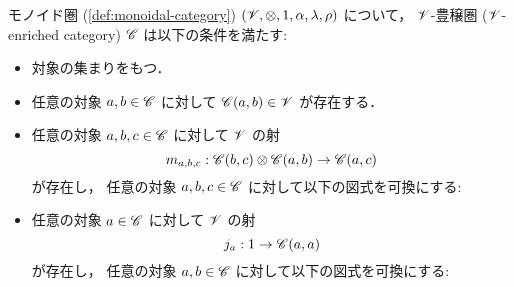 \documentclass[titlepage]{ltjsreport}
\newcommand{\objs}[1]{#1}
\newcommand{\mrp}[3]{{#1}:{#2}\to{#3}}
\newcommand{\mrps}[3]{#1(#2,#3)}
\newcommand{\id}[1]{\mathrm{id}_{#1}}
\begin{document}
{\begin{definition}[豊穣圏]
  モノイド圏 (\cref{def:monoidal-category})
  $(\mathscr{V},\otimes,1,\alpha,\lambda,\rho)$ について，
  $\mathscr{V}$-豊穣圏 ($\mathscr{V}$-enriched category) $\mathscr{C}$ は以下の条件を満たす:
  \begin{itemize}
    \item 対象の集まりをもつ．
    \item 任意の対象 $\a,\b\in\objs{\C}$ に対して
          $\mrps{\C}{\a}{\b}\in\mcat$ が存在する．
    \item 任意の対象 $\a,\b,\c\in\objs{\C}$ に対して $\mathscr{V}$ の射
          \begin{equation}
            \mrp{{m}_{\a,\b,\c}}{
              \mrps{\C}{\b}{\c}\tprod\mrps{\C}{\a}{\b}
            }{\mrps{\C}{\a}{\c}}
          \end{equation}
          が存在し，
          任意の対象 $\a,\b,\c\in\objs{\C}$ に対して以下の図式を可換にする:
          \begin{center}
          \end{center}
    \item 任意の対象 $\a\in\objs{\C}$ に対して $\mathscr{V}$ の射
          \begin{equation}
            \mrp{{j}_{\a}}{\tunit}{\mrps{\C}{\a}{\a}}
          \end{equation}
          が存在し，
          任意の対象 $\a,\b\in\objs{\C}$ に対して以下の図式を可換にする:
          \begin{center}
          \end{center}
  \end{itemize}
\end{definition}

}
\end{document}
